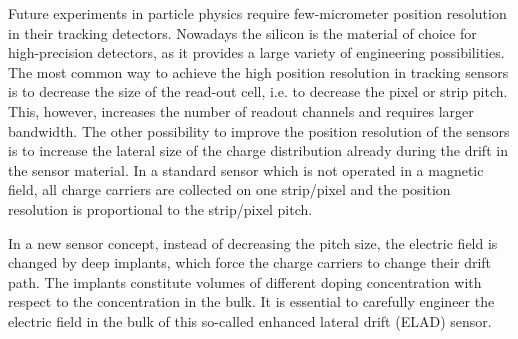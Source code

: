 
Future experiments in particle physics require few-micrometer position resolution in their tracking detectors. Nowadays the silicon is the material of choice for high-precision detectors, as it provides a large variety of engineering possibilities. The most common way to achieve the high position resolution in tracking sensors is to decrease the size of the read-out cell, i.e. to decrease the pixel or strip pitch. This, however, increases the number of readout channels and requires larger bandwidth. The other possibility to improve the position resolution of the sensors is to increase the lateral size of the charge distribution already during the drift in the sensor material. In a standard sensor which is not operated in a magnetic field, all charge carriers are collected on one strip/pixel and the position resolution is proportional to the strip/pixel pitch. 

In a new sensor concept, instead of decreasing the pitch size, the electric field is changed by deep implants, which force the charge carriers to change their drift path. The implants constitute volumes of different doping concentration with respect to the concentration in the bulk. It is essential to carefully engineer the electric field in the bulk of this so-called enhanced lateral drift (ELAD) sensor.  
